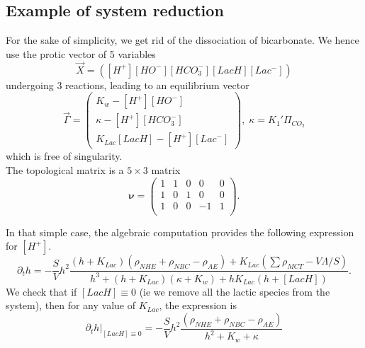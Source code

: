 \documentclass{revtex4}
\begin{document}
\subsection{Example of system reduction}
For the sake of simplicity, we get rid of the dissociation of bicarbonate.
We hence use the protic vector of 5 variables
\begin{equation}
	\vec{X} = \left( \left[H^+\right]  \left[HO^-\right] \left[HCO_3^-\right] \left[LacH\right]  \left[Lac^-\right] \right)
\end{equation}
undergoing 3 reactions, leading to an equilibrium vector
\begin{equation}
	\vec{\Gamma} =
	 \begin{pmatrix}
	K_w - \left[H^+\right]  \left[HO^-\right]\\
	 \kappa - \left[H^+\right]\left[HCO_3^-\right]\\
	K_{Lac}\left[LacH\right] - \left[H^+\right]\left[Lac^-\right]
	\end{pmatrix}, \;\kappa=K_1'\Pi_{CO_2}
\end{equation}
which is free of singularity.\\
The topological matrix is a $5\times3$ matrix
\begin{equation}
	\boldsymbol{\nu} =
	\begin{pmatrix}
	1 & 1 & 0 &  0 & 0\\
	1 & 0 & 1 &  0 & 0\\
	1 & 0 & 0 &  -1 & 1\\
	\end{pmatrix}.
\end{equation}

In that simple case, the algebraic computation provides the following expression for $\left[H^+\right]$.
\begin{equation}
\partial_t h = - \dfrac{S}{V} h^2
\dfrac{\left(h+K_{Lac}\right)\left(\rho_{NHE}+\rho_{NBC}-\rho_{AE}\right)+K_{Lac}\left(\sum \rho_{MCT}-V\Lambda/S\right)}
{h^3+(h+K_{Lac})\left(\kappa+K_w\right)+h K_{Lac}\left(h+\left[LacH\right]\right)}.
\end{equation}
We check that if $\left[LacH\right]\equiv0$ (ie we remove all the lactic species from the system), then for any value of $K_{Lac}$, the expression is
$$
	\partial_t h\vert_{\left[LacH\right]\equiv0} = 
	-\dfrac{S}{V} h^2
	\dfrac{\left(\rho_{NHE}+\rho_{NBC}-\rho_{AE}\right)}{h^2+K_w+\kappa}
$$
\end{document}
